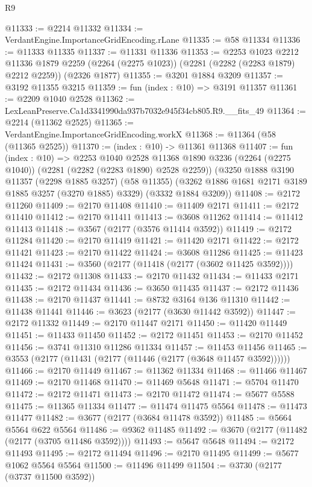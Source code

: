 \begin{lexlean}{R9}
\begin{coremodule}
@11333 := @2214 @11332
@11334 := VerdantEngine.ImportanceGridEncoding.rLane
@11335 := @58 @11334
@11336 := @11333 @11335
@11337 := @11331 @11336
@11353 := @2253
    @1023
    @2212
    @11336
    @1879
    @2259
    (@2264 (@2275 @1023))
    (@2281 (@2282 (@2283 @1879) @2212 @2259))
    (@2326 @1877)
@11355 := @3201 @1884 @3209
@11357 := @3192 @11355 @3215
@11359 := fun (index : @10) => @3191 @11357
@11361 := @2209 @1040 @2528
@11362 := LexLeanPreserve.Ca1d3341990da937b7032e945f34cb805.R9.__fits_49
@11364 := @2214 (@11362 @2525)
@11365 := VerdantEngine.ImportanceGridEncoding.workX
@11368 := @11364 (@58 (@11365 @2525))
@11370 := (index : @10) -> @11361 @11368
@11407 := fun (index : @10) =>
  @2253
    @1040
    @2528
    @11368
    @1890
    @3236
    (@2264 (@2275 @1040))
    (@2281 (@2282 (@2283 @1890) @2528 @2259))
    (@3250
      @1888
      @3190
      @11357
      (@2298 @1885 @3257)
      (@58 @11355)
      (@3262 @1886 @1681 @2171 @3189 @1885 @3257 (@3270 @1885) @3329)
      (@3332 @1884 @3209))
@11408 := @2172 @11260
@11409 := @2170 @11408
@11410 := @11409 @2171
@11411 := @2172 @11410
@11412 := @2170 @11411
@11413 := @3608 @11262
@11414 := @11412 @11413
@11418 := @3567 (@2177 (@3576 @11414 @3592))
@11419 := @2172 @11284
@11420 := @2170 @11419
@11421 := @11420 @2171
@11422 := @2172 @11421
@11423 := @2170 @11422
@11424 := @3608 @11286
@11425 := @11423 @11424
@11431 := @3560 (@2177 (@11418 (@2177 (@3602 @11425 @3592))))
@11432 := @2172 @11308
@11433 := @2170 @11432
@11434 := @11433 @2171
@11435 := @2172 @11434
@11436 := @3650 @11435
@11437 := @2172 @11436
@11438 := @2170 @11437
@11441 := @8732 @3164 @136 @11310
@11442 := @11438 @11441
@11446 := @3623 (@2177 (@3630 @11442 @3592))
@11447 := @2172 @11332
@11449 := @2170 @11447 @2171
@11450 := @11420 @11449
@11451 := @11433 @11450
@11452 := @2172 @11451
@11453 := @2170 @11452
@11456 := @3741 @11310 @11286 @11334
@11457 := @11453 @11456
@11465 := @3553 (@2177 (@11431 (@2177 (@11446 (@2177 (@3648 @11457 @3592))))))
@11466 := @2170 @11449
@11467 := @11362 @11334
@11468 := @11466 @11467
@11469 := @2170 @11468
@11470 := @11469 @5648
@11471 := @5704 @11470
@11472 := @2172 @11471
@11473 := @2170 @11472
@11474 := @5677 @5588
@11475 := @11365 @11334
@11477 := @11474 @11475 @5564
@11478 := @11473 @11477
@11482 := @3677 (@2177 (@3684 @11478 @3592))
@11485 := @5664 @5564 @622 @5564
@11486 := @9362 @11485
@11492 := @3670 (@2177 (@11482 (@2177 (@3705 @11486 @3592))))
@11493 := @5647 @5648
@11494 := @2172 @11493
@11495 := @2172 @11494
@11496 := @2170 @11495
@11499 := @5677 @1062 @5564 @5564
@11500 := @11496 @11499
@11504 := @3730 (@2177 (@3737 @11500 @3592))

\end{coremodule}
\end{lexlean}
